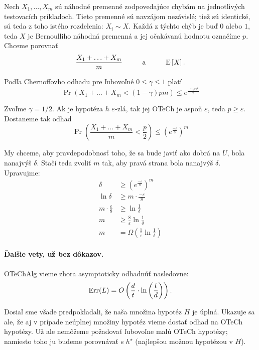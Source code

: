 Nech $X_1, \ldots, X_m$ sú náhodné premenné zodpovedajúce chybám na
jednotlivých testovacích príkladoch. Tieto premenné sú navzájom nezávislé;
tiež sú identické, sú teda z toho istého rozdelenia: $X_i \sim X$. Každá
z týchto chýb je buď $0$ alebo $1$, teda $X$ je Bernoulliho náhodná
premenná a jej očakávanú hodnotu označíme $p$. Chceme porovnať
$$ \frac{X_1 + \ldots + X_m}{m} \hspace{1cm} \text{a} \hspace{1cm} \mathrm{E} \left[ X \right]. $$

Podľa Chernoffovho odhadu pre ľubovoľné $0 \leq \gamma \leq 1$ platí
$$ \Pr \left( X_1 + \ldots + X_m < (1 - \gamma) pm \right) \leq e^\frac{-mp \gamma^2}{2} $$

Zvoľme $\gamma = 1/2$. Ak je hypotéza $h$ $\varepsilon$-zlá, tak jej
OTeCh je aspoň $\varepsilon$, teda $p \geq \varepsilon$. Dostaneme tak
odhad
$$ \Pr \left( \frac{X_1 + \ldots + X_m}{m} < \frac{p}{2} \right) \leq \left( e^\frac{-\varepsilon}{8} \right)^m $$

My chceme, aby pravdepodobnosť toho, že sa bude javiť ako dobrá na $U$,
bola nanajvýš $\delta$. Stačí teda zvoliť $m$ tak, aby pravá strana bola
nanajvýš $\delta$. Upravujme:
\begin{align}
  \delta &\geq \left( e^\frac{-\varepsilon}{8} \right)^m  \\
  \ln \delta &\geq m \cdot \frac{-\varepsilon}{8} \\
  m \cdot \frac{\varepsilon}{8} &\geq \ln \frac{1}{\delta}  \\
  m &\geq \frac{8}{\varepsilon} \ln \frac{1}{\delta} \\
  m &= \Omega \left( \frac{1}{\varepsilon} \ln \frac{1}{\delta} \right)
\end{align}


\paragraph{Ďalšie vety, už bez dôkazov.}

\begin{theorem}
  OTeChAlg vieme zhora asymptoticky odhadnúť nasledovne:
  $$ \mathrm{Err}(L) = O \left( \frac{d}{t} \cdot \ln \left( \frac{t}{d} \right) \right). $$
\end{theorem}

Dosiaľ sme všade predpokladali, že naša množina hypotéz $H$ je úplná.
Ukazuje sa ale, že aj v prípade neúplnej množiny hypotéz vieme dostať
odhad na OTeCh hypotézy. Už ale nemôžeme požadovať ľubovoľne malú OTeCh
hypotézy; namiesto toho ju budeme porovnávať s $h^\star$ (najlepšou
možnou hypotézou v $H$).

